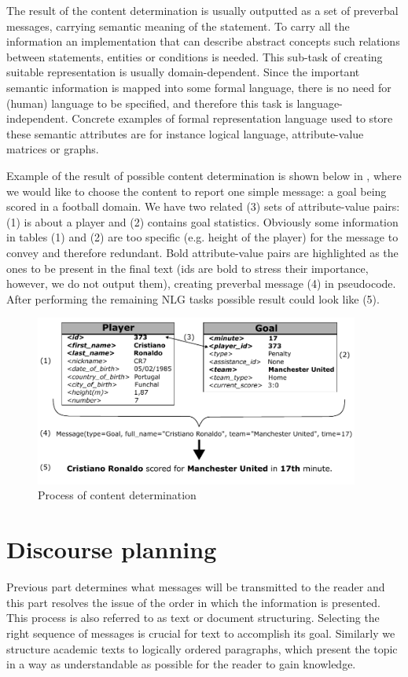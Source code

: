 The result of the content determination is usually outputted as a set of preverbal messages, carrying semantic meaning of the statement. To carry all the information an implementation that can describe abstract concepts such relations between statements, entities or conditions is needed. This sub-task of creating suitable representation is usually domain-dependent. Since the important semantic information is mapped into some formal language, there is no need for (human) language to be specified, and therefore this task is language-independent. Concrete examples of formal representation language used to store these semantic attributes are for instance logical language, attribute-value matrices or graphs.

Example of the result of possible content determination is shown below in , where we would like to choose the content to report one simple message: a goal being scored in a football domain. We have two related (3) sets of attribute-value pairs: (1) is about a player and (2) contains goal statistics. Obviously some information in tables (1) and (2) are too specific (e.g. height of the player) for the message to convey and therefore redundant. Bold attribute-value pairs are highlighted as the ones to be present in the final text (ids are bold to stress their importance, however, we do not output them), creating preverbal message (4) in pseudocode. After performing the remaining NLG tasks possible result could look like (5). 

\begin{figure}[h]
	\centerline{\includegraphics[width=0.95\textwidth]{./img/content_determination.pdf}}
	\caption{Process of content determination}
	\label{fig:cd}
\end{figure}

\section{Discourse planning}
Previous part determines what messages will be transmitted to the reader and this part resolves the issue of the order in which the information is presented. This process is also referred to as text or document structuring. Selecting the right sequence of messages is crucial for text to accomplish its goal. Similarly we structure academic texts to logically ordered paragraphs, which present the topic in a way as understandable as possible for the reader to gain knowledge.

